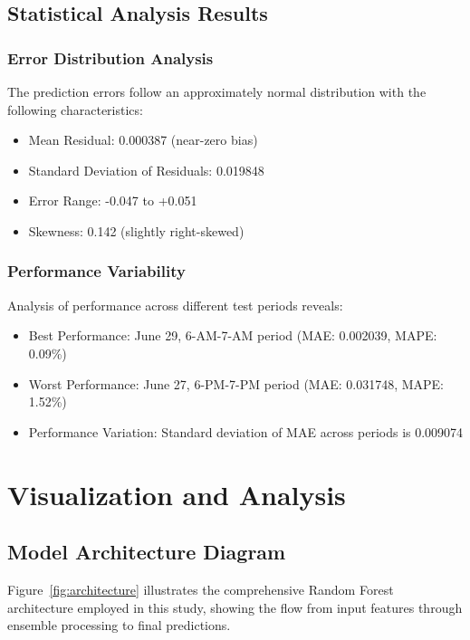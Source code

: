 \documentclass[11pt,a4paper]{article}
\begin{document}
\subsection{Statistical Analysis Results}

\subsubsection{Error Distribution Analysis}

The prediction errors follow an approximately normal distribution with the following characteristics:
\begin{itemize}
    \item Mean Residual: 0.000387 (near-zero bias)
    \item Standard Deviation of Residuals: 0.019848
    \item Error Range: -0.047 to +0.051
    \item Skewness: 0.142 (slightly right-skewed)
\end{itemize}

\subsubsection{Performance Variability}

Analysis of performance across different test periods reveals:
\begin{itemize}
    \item Best Performance: June 29, 6-AM-7-AM period (MAE: 0.002039, MAPE: 0.09\%)
    \item Worst Performance: June 27, 6-PM-7-PM period (MAE: 0.031748, MAPE: 1.52\%)
    \item Performance Variation: Standard deviation of MAE across periods is 0.009074
\end{itemize}

\section{Visualization and Analysis}

\subsection{Model Architecture Diagram}

Figure~\ref{fig:architecture} illustrates the comprehensive Random Forest architecture employed in this study, showing the flow from input features through ensemble processing to final predictions.
\end{document}
